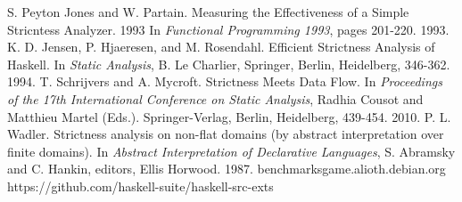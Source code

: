 \documentclass{sigplanconf}
\begin{document}



\begin{thebibliography}{}
\softraggedright

S. Peyton Jones and W. Partain. Measuring the Effectiveness of a Simple Stricntess Analyzer. 1993 In \emph{Functional Programming 1993}, pages 201-220. 1993.
K. D. Jensen, P. Hjaeresen, and M. Rosendahl. Efficient Strictness Analysis of Haskell. In \emph{Static Analysis}, B. Le Charlier, Springer, Berlin, Heidelberg, 346-362. 1994.
T. Schrijvers and A. Mycroft. Strictness Meets Data Flow. In \emph{Proceedings of the 17th International Conference on Static Analysis}, Radhia Cousot and Matthieu Martel (Eds.). Springer-Verlag, Berlin, Heidelberg, 439-454. 2010.
P. L. Wadler. Strictness analysis on non-flat domains (by abstract interpretation over finite domains). In \emph{Abstract Interpretation of Declarative Languages}, S. Abramsky and C. Hankin, editors, Ellis Horwood. 1987.
benchmarksgame.alioth.debian.org
https://github.com/haskell-suite/haskell-src-exts
\end{thebibliography}
\end{document}
